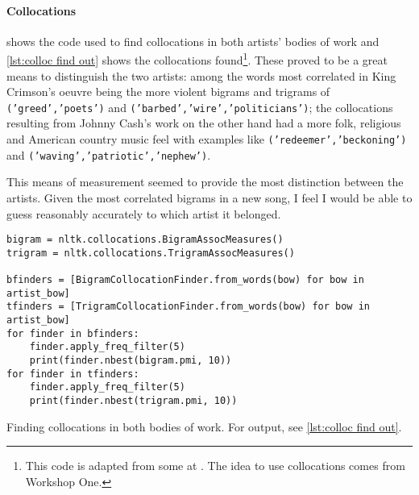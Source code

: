 \paragraph{Collocations}

 shows the code used to find collocations in both artists' bodies of work and \cref{lst:colloc find out} shows the collocations found\footnote{This code is adapted from some at \cite{collocations-nltk}. The idea to use collocations comes from Workshop One.}. These proved to be a great means to distinguish the two artists: among the words most correlated in King Crimson's oeuvre being the more violent bigrams and trigrams of \texttt{('greed','poets')} and \texttt{('barbed','wire','politicians')}; the collocations resulting from Johnny Cash's work on the other hand had a more folk, religious and American country music feel with examples like \texttt{('redeemer','beckoning')} and \texttt{('waving','patriotic','nephew')}.

This means of measurement seemed to provide the most distinction between the artists. Given the most correlated bigrams in a new song, I feel I would be able to guess reasonably accurately to which artist it belonged.

\begin{listing}[h]
	\begin{verbatim}
bigram = nltk.collocations.BigramAssocMeasures()
trigram = nltk.collocations.TrigramAssocMeasures()

bfinders = [BigramCollocationFinder.from_words(bow) for bow in artist_bow]
tfinders = [TrigramCollocationFinder.from_words(bow) for bow in artist_bow]
for finder in bfinders:
	finder.apply_freq_filter(5)
	print(finder.nbest(bigram.pmi, 10))
for finder in tfinders:
	finder.apply_freq_filter(5)
	print(finder.nbest(trigram.pmi, 10))
	\end{verbatim}
\caption{Finding collocations in both bodies of work. For output, see \cref{lst:colloc find out}.}
\label{lst:colloc find}
\end{listing}

